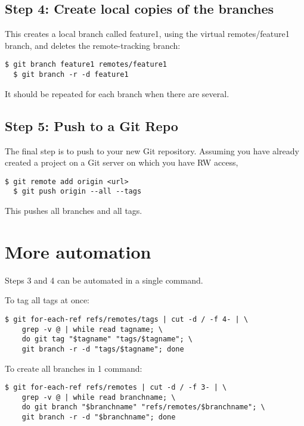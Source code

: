 \documentclass{../../common/tufte-latex/tufte-handout}
\begin{document}
\subsection{Step 4: Create local copies of the branches}

This creates a local branch called feature1, using the virtual remotes/feature1 branch, and deletes the remote-tracking branch:
\begin{lstlisting}[style=BashInputStyle]
  $ git branch feature1 remotes/feature1
  $ git branch -r -d feature1
\end{lstlisting}

It should be repeated for each branch when there are several.

\subsection{Step 5: Push to a Git Repo}

The final step is to push to your new Git repository.
Assuming you have already created a project on a Git server on which you have RW access,

\begin{lstlisting}[style=BashInputStyle]
  $ git remote add origin <url>
  $ git push origin --all --tags
\end{lstlisting}

This pushes all branches and all tags.

\section{More automation}

Steps 3 and 4 can be automated in a single command.

To tag all tags at once:
\begin{lstlisting}[style=BashInputStyle]
  $ git for-each-ref refs/remotes/tags | cut -d / -f 4- | \
    grep -v @ | while read tagname; \
    do git tag "$tagname" "tags/$tagname"; \
    git branch -r -d "tags/$tagname"; done
\end{lstlisting}

To create all branches in 1 command:
\begin{lstlisting}[style=BashInputStyle]
  $ git for-each-ref refs/remotes | cut -d / -f 3- | \
    grep -v @ | while read branchname; \
    do git branch "$branchname" "refs/remotes/$branchname"; \
    git branch -r -d "$branchname"; done
\end{lstlisting}
\end{document}
